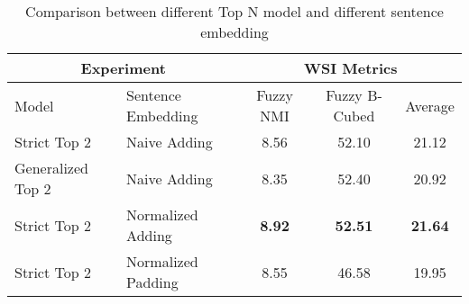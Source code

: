 \begin{table}[htbp!]
    \centering
    \begin{tabular}{llccc}
    \toprule
        \multicolumn{2}{c}{Experiment}          & \multicolumn{3}{c}{WSI Metrics}           \\
    \midrule
        Model              & Sentence Embedding & Fuzzy NMI     & Fuzzy B-Cubed  & Average  \\
    \midrule
        Strict Top 2       & Naive Adding       & 8.56          & 52.10          & 21.12    \\
        Generalized Top 2  & Naive Adding       & 8.35          & 52.40          & 20.92    \\
        Strict Top 2       & Normalized Adding  & \bf8.92       & \bf52.51       & \bf21.64 \\
        Strict Top 2       & Normalized Padding & 8.55          & 46.58          & 19.95    \\
    \bottomrule
    \end{tabular}
\caption{Comparison between different Top N model and different sentence embedding}
\label{tab:different_sentence_embedding}
\end{table}